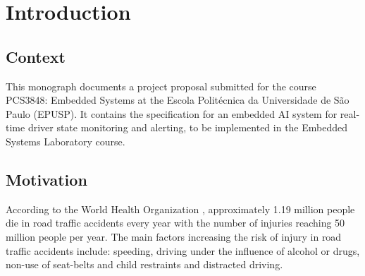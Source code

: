 \chapter{Introduction} \label{cap:introducao}




\section{Context}

This monograph documents a project proposal submitted for the course PCS3848: Embedded Systems at the Escola Politécnica da Universidade de São Paulo (EPUSP). It contains the specification for an embedded AI system for real-time driver state monitoring and alerting, to be implemented in the Embedded Systems Laboratory course.

\section{Motivation}


According to the World Health Organization \cite{who2023}, approximately 1.19 million people die in road traffic accidents every year with the number of injuries reaching 50 million people per year. The main factors increasing the risk of injury in road traffic accidents include: speeding, driving under the influence of alcohol or drugs, non-use of seat-belts and child restraints and distracted driving.

